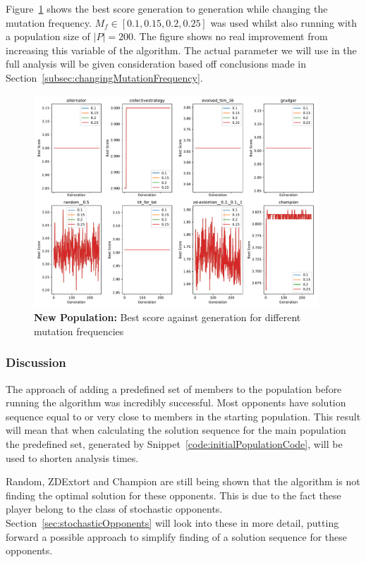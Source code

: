Figure~\ref{fig:NEW-MUT-FREQ-bs-gen-all} shows the best score generation to generation while changing the mutation frequency.
\(M_f \in [0.1,0.15,0.2,0.25] \) was used whilst also running with a population size of \(|P|=200\).
The figure shows no real improvement from increasing this variable of the algorithm.
The actual parameter we will use in the full analysis will be given consideration based off conclusions made in Section~\ref{subsec:changingMutationFrequency}.

\begin{figure}[ht]
    \includegraphics[width=0.95\textwidth, keepaspectratio, center]{./img/plots/NEW_MUT_FREQ_bs_v_gen_all.pdf}
    \caption{\textbf{New Population:} Best score against generation for different mutation frequencies}\label{fig:NEW-MUT-FREQ-bs-gen-all}
\end{figure}

\subsubsection{Discussion}\label{subsubsec:discussion}
The approach of adding a predefined set of members to the population before running the algorithm was incredibly successful.
Most opponents have solution sequence equal to or very close to members in the starting population.
This result will mean that when calculating the solution sequence for the main population the predefined set, generated by Snippet~\ref{code:initialPopulationCode}, will be used to shorten analysis times.

Random, ZDExtort and Champion are still being shown that the algorithm is not finding the optimal solution for these opponents.
This is due to the fact these player belong to the class of stochastic opponents.
Section~\ref{sec:stochasticOpponents} will look into these in more detail, putting forward a possible approach to simplify finding of a solution sequence for these opponents.

